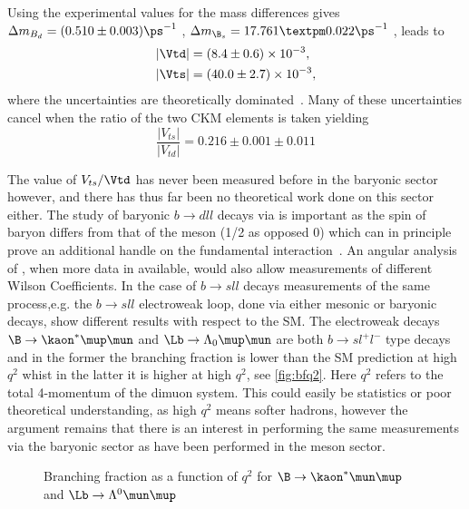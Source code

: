 Using the experimental values for the mass differences gives $\Delta m_{B_{d}} = (0.510\pm0.003)\ps^{-1}$ \cite{pdg},  $\Delta m_{\B_{s}} = 17.761 ± 0.022\ps^{-1}$ \cite{bslhcb}, leads to
\begin{equation}
  \begin{split}
    & |\Vtd| = (8.4\pm0.6)\times 10^{-3},\\
    & |\Vts| = (40.0\pm2.7)\times 10^{-3},
  \end{split}
\end{equation}
where the uncertainties are theoretically dominated~\cite{pdg}. Many of these uncertainties cancel when the ratio of the two CKM elements is taken yielding
\begin{equation}
  \frac{|V_{ts}|}{|V_{td}|} = 0.216\pm0.001\pm 0.011
  \label{eq:vtsvtd}
\end{equation}


The value of $V_{ts}/\Vtd$ has never been measured before in the baryonic sector however, and there has thus far been no theoretical work done on this sector either. The study of baryonic $b\to dll$ decays via \Lbpi is important as the spin of \Lb baryon differs from that of the \B meson (1/2 as opposed 0) which can in principle prove an additional handle on the fundamental interaction~\cite{Meinel}. An angular analysis of \Lbpi, when more data in available, would also allow measurements of different Wilson Coefficients. In the case of $b\to sll$ decays measurements of the same process,e.g. the $b\to sll$ electroweak loop, done via either mesonic or baryonic decays, show different results with respect to the SM. The electroweak decays $\B\to\kaon^{*}\mup\mun$ and $\Lb\to\Lambda_{0}\mup\mun$ are both $b\to sl^{+}l^{-}$ type decays and in the former the branching fraction is lower than the SM prediction at high $q^{2}$ whist in the latter it is higher at high $q^{2}$, see \autoref{fig:bfq2}. Here $q^{2}$ refers to the total 4-momentum of the dimuon system. This could easily be statistics or poor theoretical understanding, as high $q^{2}$ means softer hadrons, however the argument remains that there is an interest in performing the same measurements via the baryonic sector as have been performed in the meson sector.
\begin{figure}[!h]\def\nh{0.5\textwidth}
  \centering
  \hspace*{-2cm}  
  \caption{Branching fraction as a function of $q^{2}$ for \protect{} $\B\to\kaon^{*}\mun\mup$~\cite{LHCB-PAPER-2015-051} and \protect{} $\Lb\to\Lambda^{0}\mun\mup$~\cite{LHCB-PAPER-2015-009}}
  \label{fig:bfq2}
\end{figure}

